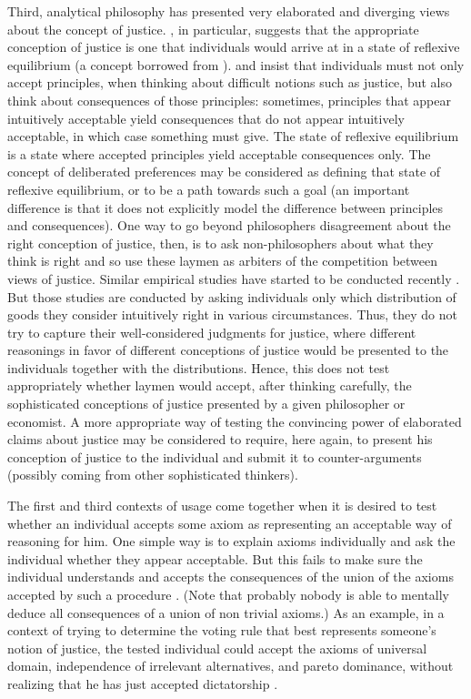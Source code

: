 \documentclass[version=last, pagesize, twoside=off, bibliography=totoc, DIV=calc, fontsize=12pt, a4paper, french, english]{scrartcl}
\begin{document}
Third, analytical philosophy has presented very elaborated and diverging views about the concept of justice. \citet{rawls_theory_1999}, in particular, suggests that the appropriate conception of justice is one that individuals would arrive at in a state of reflexive equilibrium (a concept borrowed from \citet{goodman_fact_1983}). \citeauthor{rawls_theory_1999} and \citeauthor{goodman_fact_1983} insist that individuals must not only accept principles, when thinking about difficult notions such as justice, but also think about consequences of those principles: sometimes, principles that appear intuitively acceptable yield consequences that do not appear intuitively acceptable, in which case something must give. The state of reflexive equilibrium is a state where accepted principles yield acceptable consequences only. The concept of deliberated preferences may be considered as defining that state of reflexive equilibrium, or to be a path towards such a goal (an important difference is that it does not explicitly model the difference between principles and consequences). One way to go beyond philosophers disagreement about the right conception of justice, then, is to ask non-philosophers about what they think is right and so use these laymen as arbiters of the competition between views of justice. Similar empirical studies have started to be conducted recently \citep{gaertner_empirical_2012}. But those studies are conducted by asking individuals only which distribution of goods they consider intuitively right in various circumstances. Thus, they do not try to capture their well-considered judgments for justice, where different reasonings in favor of different conceptions of justice would be presented to the individuals together with the distributions. Hence, this does not test appropriately whether laymen would accept, after thinking carefully, the sophisticated conceptions of justice presented by a given philosopher or economist. A more appropriate way of testing the convincing power of elaborated claims about justice may be considered to require, here again, to present his conception of justice to the individual and submit it to counter-arguments (possibly coming from other sophisticated thinkers).

The first and third contexts of usage come together when it is desired to test whether an individual accepts some axiom as representing an acceptable way of reasoning for him. One simple way is to explain axioms individually and ask the individual whether they appear acceptable. But this fails to make sure the individual understands and accepts the consequences of the union of the axioms accepted by such a procedure \citep{meinard_justification_2018}. (Note that probably nobody is able to mentally deduce all consequences of a union of non trivial axioms.) As an example, in a context of trying to determine the voting rule that best represents someone’s notion of justice, the tested individual could accept the axioms of universal domain, independence of irrelevant alternatives, and pareto dominance, without realizing that he has just accepted dictatorship \citep{arrow_social_1963}.
\end{document}
